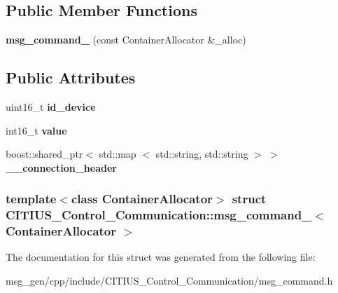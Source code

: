 \subsection*{\-Public \-Member \-Functions}
\begin{DoxyCompactItemize}
\item 
\hypertarget{struct_c_i_t_i_u_s___control___communication_1_1msg__command___a959bd6a0751060263f9d9edaf277c9e4}{{\bfseries msg\-\_\-command\-\_\-} (const \-Container\-Allocator \&\-\_\-alloc)}\label{struct_c_i_t_i_u_s___control___communication_1_1msg__command___a959bd6a0751060263f9d9edaf277c9e4}

\end{DoxyCompactItemize}
\subsection*{\-Public \-Attributes}
\begin{DoxyCompactItemize}
\item 
\hypertarget{struct_c_i_t_i_u_s___control___communication_1_1msg__command___a9ae56ba6044c95c308cb6af94b19f5a7}{uint16\-\_\-t {\bfseries id\-\_\-device}}\label{struct_c_i_t_i_u_s___control___communication_1_1msg__command___a9ae56ba6044c95c308cb6af94b19f5a7}

\item 
\hypertarget{struct_c_i_t_i_u_s___control___communication_1_1msg__command___a05805b5745747c55bce608781c3555b9}{int16\-\_\-t {\bfseries value}}\label{struct_c_i_t_i_u_s___control___communication_1_1msg__command___a05805b5745747c55bce608781c3555b9}

\item 
\hypertarget{struct_c_i_t_i_u_s___control___communication_1_1msg__command___ae0b3c1004b9762f902e962205ba2e465}{boost\-::shared\-\_\-ptr$<$ std\-::map\*
$<$ std\-::string, std\-::string $>$ $>$ {\bfseries \-\_\-\-\_\-connection\-\_\-header}}\label{struct_c_i_t_i_u_s___control___communication_1_1msg__command___ae0b3c1004b9762f902e962205ba2e465}

\end{DoxyCompactItemize}
\subsubsection*{template$<$class Container\-Allocator$>$ struct C\-I\-T\-I\-U\-S\-\_\-\-Control\-\_\-\-Communication\-::msg\-\_\-command\-\_\-$<$ Container\-Allocator $>$}



\-The documentation for this struct was generated from the following file\-:\begin{DoxyCompactItemize}
\item 
msg\-\_\-gen/cpp/include/\-C\-I\-T\-I\-U\-S\-\_\-\-Control\-\_\-\-Communication/msg\-\_\-command.\-h\end{DoxyCompactItemize}
